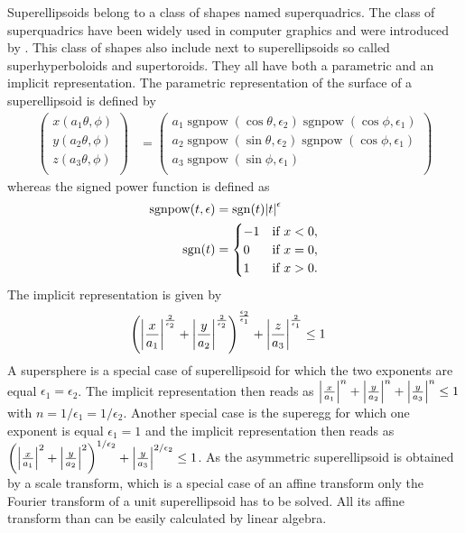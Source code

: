 Superellipsoids belong to a class of shapes named superquadrics. The class of superquadrics have been widely used in computer graphics and were introduced by \cite{Barr1981}. This class of shapes also include next to superellipsoids so called superhyperboloids and supertoroids. They all have both a
parametric and an implicit representation. The parametric representation of the surface of a superellipsoid is defined by
\begin{align}\label{eq:superellipsoid:parametric}
  \left(
    \begin{array}{c}
      x(a_1\theta,\phi) \\
      y(a_2\theta,\phi) \\
      z(a_3\theta,\phi) \\
    \end{array}
  \right)
 &=
 \left(
    \begin{array}{c}
     a_1 \operatorname{sgnpow}(\cos\theta,\epsilon_2)\operatorname{sgnpow}(\cos\phi,\epsilon_1)  \\
     a_2 \operatorname{sgnpow}(\sin\theta,\epsilon_2)\operatorname{sgnpow}(\cos\phi,\epsilon_1)  \\
     a_3 \operatorname{sgnpow}(\sin\phi,\epsilon_1) \\
    \end{array}
  \right)
\end{align}
whereas the signed power function is defined as
\begin{align}\label{eq:sgnpow}
  \operatorname{sgnpow}(t,\epsilon) &= \operatorname{sgn}(t)\abs{t}^\epsilon \\
  \operatorname{sgn}(t) &=
  \begin{cases}
    -1&{\text{if }}x<0,\\
     0&{\text{if }}x=0,\\
     1&{\text{if }}x>0.
  \end{cases}
\end{align}
The implicit representation is given by
\begin{align}\label{eq:superellipsoid:implicit}
\left(
     \abs{\frac{x}{a_1}}^{\frac{2}{\epsilon_2}}+
     \abs{\frac{y}{a_2}}^{\frac{2}{\epsilon_2}}
\right)^{\frac{\epsilon_2}{\epsilon_1}} +
\abs{\frac{z}{a_3}}^{\frac{2}{\epsilon_1}} &\leq 1
\end{align}
A supersphere is a special case of superellipsoid for which the two exponents are equal $\epsilon_1=\epsilon_2$. The implicit representation then reads as
$\abs{\frac{x}{a_1}}^n+\abs{\frac{y}{a_2}}^n+\abs{\frac{y}{a_3}}^n\leq 1$ with $n=1/\epsilon_1=1/\epsilon_2$.
Another special case is the superegg for which one exponent is equal $\epsilon_1=1$ and the implicit representation then reads as
$\left(\abs{\frac{x}{a_1}}^2+\abs{\frac{y}{a_2}}^2\right)^{1/\epsilon_2}+\abs{\frac{y}{a_3}}^{2/\epsilon_2}\leq 1$.
As the asymmetric superellipsoid is obtained by a scale transform, which is a special case of an affine transform only the Fourier transform of a unit superellipsoid has to be solved. All its affine transform than can be easily calculated by linear algebra.


